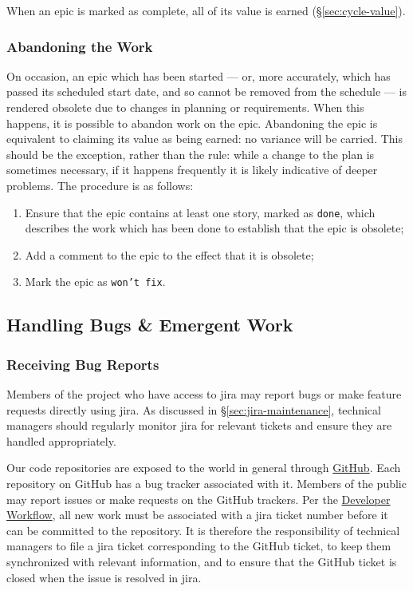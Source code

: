 When an \gls{epic} is marked as complete, all of its value is earned (\S\ref{sec:cycle-value}).

\subsubsection{Abandoning the Work}
\label{sec:epic-wontfix}

On occasion, an \gls{epic} which has been started --- or, more accurately, which has passed its scheduled start date, and so cannot be removed from the schedule --- is rendered obsolete due to changes in planning or requirements.
When this happens, it is possible to abandon work on the epic.
Abandoning the \gls{epic} is equivalent to claiming its value as being earned: no variance will be carried.
This should be the exception, rather than the rule: while a change to the plan is sometimes necessary, if it happens frequently it is likely indicative of deeper problems.
The procedure is as follows:

\begin{enumerate}

  \item{Ensure that the \gls{epic} contains at least one \gls{story}, marked as \texttt{done}, which describes the work which has been done to establish that the \gls{epic} is obsolete;}
  \item{Add a comment to the \gls{epic} to the effect that it is obsolete;}
  \item{Mark the epic as \texttt{won't fix}.}

\end{enumerate}

\subsection{Handling Bugs \& Emergent Work}
\label{sec:bugs}

\subsubsection{Receiving Bug Reports}\label{receiving-bug-reports}

Members of the project who have access to \gls{jira} may report bugs or make feature requests directly using \gls{jira}.
As discussed in \S\ref{sec:jira-maintenance}, technical managers should regularly monitor \gls{jira} for relevant tickets and ensure they are handled appropriately.

Our code repositories are exposed to the world in general through \href{https://github.com/lsst/}{GitHub}.
Each repository on GitHub has a bug tracker associated with it.
Members of the public may report issues or make requests on the GitHub trackers.
Per the \href{https://developer.lsst.io/processes/workflow.html}{Developer Workflow}, all new work must be associated with a \gls{jira} ticket number before it can be committed to the repository.
It is therefore the responsibility of technical managers to file a \gls{jira} ticket corresponding to the GitHub ticket, to keep them synchronized with relevant information, and to ensure that the GitHub ticket is closed when the issue is resolved in \gls{jira}.

